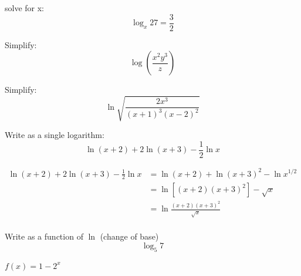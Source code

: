 \documentclass[fleqn,addpoints]{exam}
\begin{document}
\begin{questions}

    \question[5] solve for x:
      \[
        \log_x 27 = \frac{3}{2}
      \]

    \question[5] Simplify:
      \[
        \log \left( \frac{x^2y^3}{z} \right)
      \]

    \question[7] Simplify:
      \[
        \ln \sqrt{ \frac{2x^3}{(x + 1)^3 (x - 2)^2} }
      \]

    \question[7] Write as a single logarithm:
      \[
        \ln (x + 2) + 2 \ln (x + 3) - \frac{1}{2} \ln x 
      \]

      \begin{solution}
        \begin{align*}
          \ln (x + 2) + 2 \ln (x + 3) - \frac{1}{2} \ln x & = \ln (x + 2) + \ln (x + 3)^2 - \ln x^{1/2} \\
                                                          & = \ln \left[ (x + 2)(x + 3)^2 \right] - \sqrt{x} \\
                                                          & = \ln \frac{ (x + 2)(x + 3)^2 }{\sqrt{x}} \\
        \end{align*}
      \end{solution}

    \question[3] Write as a function of $\ln$ (change of base)
      \[
        \log_5 7
      \]

    \question $f(x) = 1 - 2^x$
\end{questions}
\end{document}
